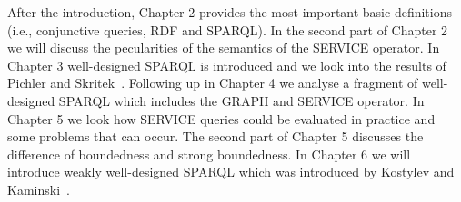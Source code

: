 After the introduction, Chapter 2 provides the most important basic definitions
(i.e., conjunctive queries, RDF and SPARQL). In the second part of Chapter 2 
we will discuss the pecularities of the semantics of the SERVICE operator. In
Chapter 3 well-designed SPARQL is introduced and
we look into the results of Pichler and Skritek~\cite{pichler2014containment}. Following up
in Chapter 4 we analyse a fragment of well-designed SPARQL which includes 
the GRAPH and SERVICE operator. In Chapter 5 we look how SERVICE queries could be evaluated in practice
and some problems that can occur. The second part of Chapter
5 discusses the difference of boundedness and strong boundedness. In 
Chapter 6 we will introduce weakly well-designed SPARQL which was introduced by Kostylev and Kaminski~\cite{kaminski_bwd}.

